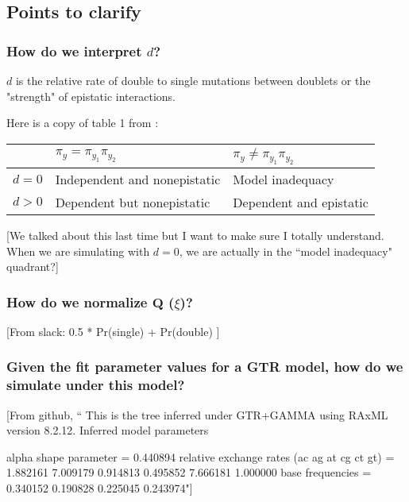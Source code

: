\documentclass[11pt]{article}
\newcommand\skhcomment[1]{{\color{violet}[#1]}}
\begin{document}
\subsection*{Points to clarify}

\subsubsection*{How do we interpret $d$?}

$d$ is the relative rate of double to single mutations between doublets or the "strength" of epistatic interactions. 

Here is a copy of table 1 from \cite{nasrallah2013phylogenetic}: 

\begin{tabular}{ |p{1cm}|p{5cm}|p{5cm}|  }
 \hline
& $\pi_y = \pi_{y_1}\pi_{y_2}$&$\pi_y \ne \pi_{y_1}\pi_{y_2}$\\
 \hline
$d=0$  & Independent and nonepistatic & Model inadequacy \\
\hline
 $d > 0$  & Dependent but nonepistatic & Dependent and epistatic\\
 \hline
\end{tabular}

\skhcomment{We talked about this last time but I want to make sure I totally understand. When we are simulating with $d=0$, we are actually in the ``model inadequacy" quadrant?}

\subsubsection*{How do we normalize $\boldsymbol{Q}$ ($\xi$)?}

\skhcomment{From slack: 0.5 * Pr(single) + Pr(double) }

\subsubsection*{Given the fit parameter values for a GTR model, how do we simulate under this model?}

\skhcomment{From github, ``
This is the tree inferred under GTR+GAMMA using RAxML version 8.2.12. Inferred model parameters

alpha shape parameter = 0.440894
relative exchange rates (ac ag at cg ct gt) = 1.882161 7.009179 0.914813 0.495852 7.666181 1.000000
base frequencies = 0.340152 0.190828 0.225045 0.243974"}

\clearpage 

{\small

}
\end{document}
